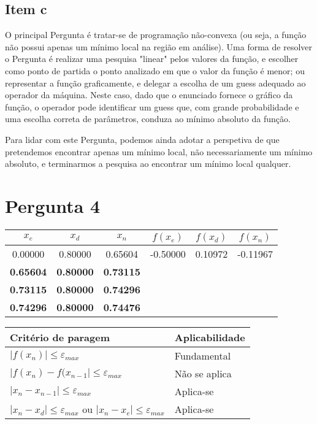 {\subsection{Item c}
O principal Pergunta é tratar-se de programação não-convexa (ou seja, a função não possui apenas um mínimo local na região em análise). Uma forma de resolver o Pergunta é realizar uma pesquisa "linear" pelos valores da função, e escolher como ponto de partida o ponto analizado em que o valor da função é menor; ou representar a função graficamente, e delegar a escolha de um guess adequado ao operador da máquina. Neste caso, dado que o enunciado fornece o gráfico da função, o operador pode identificar um guess que, com grande probabilidade e uma escolha correta de parâmetros, conduza ao mínimo absoluto da função.\par
Para lidar com este Pergunta, podemos ainda adotar a perspetiva de que pretendemos encontrar apenas um mínimo local, não necessariamente um mínimo absoluto, e terminarmos a pesquisa ao encontrar um mínimo local qualquer.

\newpage

\section{Pergunta 4}

\begin{center}
    \begin{tabular}{c | c | c | c | c | c}
        $x_e$ & $x_d$ & $x_n$ & $f(x_e)$ & $f(x_d)$ & $f(x_n)$ \\ \hline
        0.00000 & 0.80000 & 0.65604 & -0.50000 & 0.10972 & -0.11967 \\
        \textbf{0.65604} & \textbf{0.80000} & \textbf{0.73115} \\
        \textbf{0.73115} & \textbf{0.80000} & \textbf{0.74296} \\
        \textbf{0.74296} & \textbf{0.80000} & \textbf{0.74476} \\
    \end{tabular}
\end{center}
\begin{center}
    \begin{tabular}{l | l}
        Critério de paragem & Aplicabilidade \\ \hline
        $|f(x_n)          | \leq \varepsilon_{max}$ & Fundamental \\
        $|f(x_n)-f(x_{n-1}| \leq \varepsilon_{max}$ & Não se aplica \\
        $|x_n-x_{n-1}     | \leq \varepsilon_{max}$ & Aplica-se \\
        $|x_n-x_d| \leq \varepsilon_{max}$ ou $|x_n-x_e| \leq \varepsilon_{max}$ & Aplica-se
    \end{tabular}
\end{center}

}
